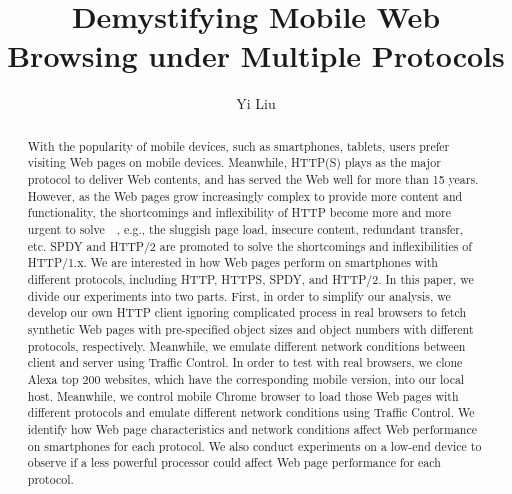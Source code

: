 \documentclass[10pt, onecolumn]{IEEEtran}
\begin{document}
\title{Demystifying Mobile Web Browsing under Multiple Protocols}
\author{Yi Liu}

\maketitle

\begin{abstract}
With the popularity of mobile devices, such as smartphones, tablets, users prefer visiting Web pages on mobile devices. Meanwhile, HTTP(S) plays as the major protocol to deliver Web contents, and has served the Web well for more than 15 years. However, as the Web pages grow increasingly complex to provide more content and functionality, the shortcomings and inflexibility of HTTP become more and more urgent to solve~\cite{Stenberg:CCR14}~\cite{httpproblem}, e.g., the sluggish page load, insecure content, redundant transfer, etc. SPDY and HTTP/2 are promoted to solve the shortcomings and inflexibilities of HTTP/1.x. We are interested in how Web pages perform on smartphones with different protocols, including HTTP, HTTPS, SPDY, and HTTP/2. In this paper, we divide our experiments into two parts. First, in order to simplify our analysis, we develop our own HTTP client ignoring complicated process in real browsers to fetch synthetic Web pages with pre-specified object sizes and object numbers with different protocols, respectively. Meanwhile, we emulate different network conditions between client and server using Traffic Control. In order to test with real browsers, we clone Alexa top 200 websites, which have the corresponding mobile version, into our local host. Meanwhile, we control mobile Chrome browser to load those Web pages with different protocols and emulate different network conditions using Traffic Control. We identify how Web page characteristics and network conditions affect Web performance on smartphones for each protocol. We also conduct experiments on a low-end device to observe if a less powerful processor could affect Web page performance for each protocol.
\end{abstract}
















\end{document}
